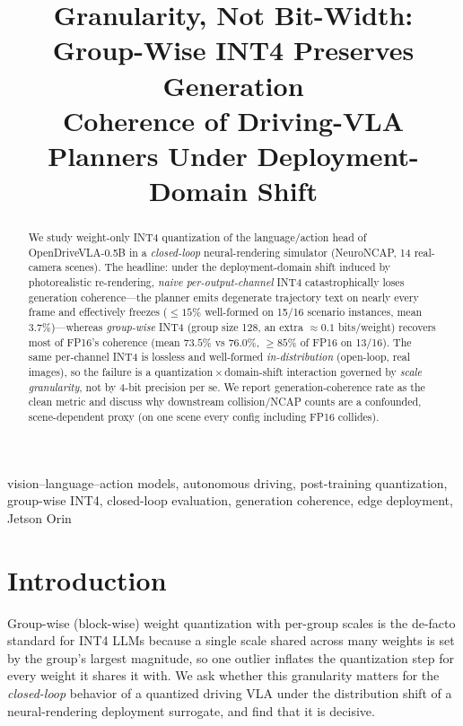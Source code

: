 \documentclass[conference]{IEEEtran}
\title{\textbf{Granularity, Not Bit-Width: Group-Wise INT4 Preserves Generation\\
Coherence of Driving-VLA Planners Under Deployment-Domain Shift}}
\author{\IEEEauthorblockN{Justin Williams, Kishor Datta Gupta, Roy George, Mrinmoy Sarkar}
\IEEEauthorblockA{Clark Atlanta University \\ \texttt{justinwilliamstech693@gmail.com}}}
\begin{document}
\maketitle

\begin{abstract}
We study weight-only INT4 quantization of the language/action head of OpenDriveVLA-0.5B in a
\emph{closed-loop} neural-rendering simulator (NeuroNCAP, 14 real-camera scenes). The headline: under the
deployment-domain shift induced by photorealistic re-rendering, \emph{naive per-output-channel}
INT4 catastrophically loses generation coherence---the planner emits degenerate trajectory text on
nearly every frame and effectively freezes ($\le 15\%$ well-formed on 15/16 scenario instances,
mean $3.7\%$)---whereas \emph{group-wise} INT4 (group size 128, an extra $\approx 0.1$ bits/weight)
recovers most of FP16's coherence (mean $73.5\%$ vs $76.0\%$, $\ge 85\%$ of FP16 on 13/16). The same
per-channel INT4 is lossless
and well-formed \emph{in-distribution} (open-loop, real images), so the failure is a
quantization\,$\times$\,domain-shift interaction governed by \emph{scale granularity}, not by 4-bit
precision per se. We report generation-coherence rate as the clean metric and discuss why downstream
collision/NCAP counts are a confounded, scene-dependent proxy (on one scene every config including
FP16 collides).
\end{abstract}
\begin{IEEEkeywords}
vision--language--action models, autonomous driving, post-training quantization, group-wise INT4, closed-loop evaluation, generation coherence, edge deployment, Jetson Orin
\end{IEEEkeywords}

\section{Introduction}
Group-wise (block-wise) weight quantization with per-group scales is the de-facto standard for
INT4 LLMs because a single scale shared across many weights is set by the group's largest
magnitude, so one outlier inflates the quantization step for every weight it shares it with. We
ask whether this granularity matters for the \emph{closed-loop} behavior of a quantized driving
VLA under the distribution shift of a neural-rendering deployment surrogate, and find that it is
decisive.
\end{document}
